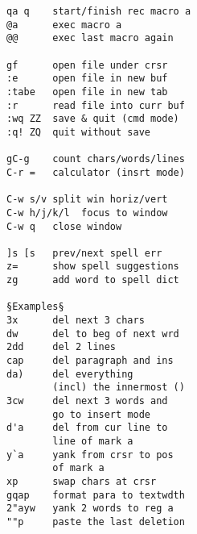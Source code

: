 \documentclass{article}
\begin{document}
\begin{multicols}{4}
\begin{lstlisting}
qa q    start/finish rec macro a
@a      exec macro a
@@      exec last macro again

gf      open file under crsr
:e      open file in new buf
:tabe   open file in new tab
:r      read file into curr buf
:wq ZZ  save & quit (cmd mode)
:q! ZQ  quit without save

gC-g    count chars/words/lines
C-r =   calculator (insrt mode)

C-w s/v split win horiz/vert
C-w h/j/k/l  focus to window
C-w q   close window

]s [s   prev/next spell err
z=      show spell suggestions
zg      add word to spell dict

§Examples§
3x      del next 3 chars
dw      del to beg of next wrd
2dd     del 2 lines
cap     del paragraph and ins
da)     del everything
        (incl) the innermost ()
3cw     del next 3 words and
        go to insert mode
d'a     del from cur line to
        line of mark a
y`a     yank from crsr to pos
        of mark a
xp      swap chars at crsr
gqap    format para to textwdth
2"ayw   yank 2 words to reg a
""p     paste the last deletion
\end{lstlisting}
\end{multicols}
\end{document}
